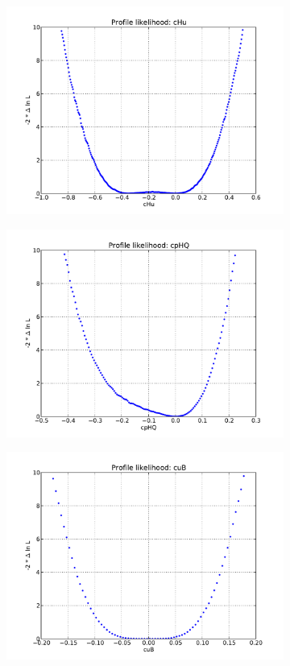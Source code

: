 \begin{figure}[!htb]
\begin{subfigure}{0.5\textwidth}
    \includegraphics[width=\textwidth]{figures/eight-TeV/NP/cHu_NLL}
    \caption{}
  \end{subfigure}%
  \begin{subfigure}{0.5\textwidth}
    \includegraphics[width=\textwidth]{figures/eight-TeV/NP/cpHQ_NLL}
    \caption{}
  \end{subfigure}
  \begin{subfigure}{0.5\textwidth}
    \includegraphics[width=\textwidth]{figures/eight-TeV/NP/cuB_NLL}

\end{subfigure}
\end{figure}

